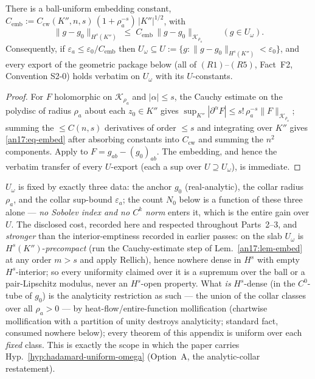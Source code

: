 \begin{lemma}
\label{an17:lem-embed}%
\label{an17:embed}%
There is a ball-uniform embedding constant, $C_{\mathrm{emb}}:=C_{\mathrm{cw}}
(K'',n,s)\,(1+\rho_a^{-s})\,|K''|^{1/2}$, with
\begin{equation}\label{an17:eq-embed}
 \|g-g_0\|_{H^s(K'')}\;\le\;C_{\mathrm{emb}}\,\|g-g_0\|_{\mathcal K_{\rho_a}}
 \qquad(g\in U_\omega).
\end{equation}
Consequently, if $\varepsilon_a\le\varepsilon_0/C_{\mathrm{emb}}$ then
$U_\omega\subseteq U:=\{g:\|g-g_0\|_{H^s(K'')}<\varepsilon_0\}$, and every export
of the geometric package below (all of $(R1)$--$(R5)$, Fact~F2, Convention
S2-0) holds verbatim on $U_\omega$ with its $U$-constants.
\end{lemma}
\begin{proof}
For $F$ holomorphic on $\mathcal K_{\rho_a}$ and $|\alpha|\le s$, the Cauchy
estimate on the polydisc of radius $\rho_a$ about each $z_0\in K''$ gives
$\sup_{K''}|\partial^\alpha F|\le s!\,\rho_a^{-s}\|F\|_{\mathcal K_{\rho_a}}$;
summing the $\le C(n,s)$ derivatives of order $\le s$ and integrating over $K''$
gives \eqref{an17:eq-embed} after absorbing constants into $C_{\mathrm{cw}}$ and
summing the $n^2$ components. Apply to $F=g_{ab}-(g_0)_{ab}$. The embedding, and
hence the verbatim transfer of every $U$-export (each a sup over $U\supseteq
U_\omega$), is immediate.
\end{proof}

\begin{remark}
\label{an17:rem-data}
$U_\omega$ is fixed by exactly three data: the anchor $g_0$ (real-analytic), the
collar radius $\rho_a$, and the collar sup-bound $\varepsilon_a$; the count $N_0$
below is a function of these three alone --- \emph{no Sobolev index and no $C^k$
norm} enters it, which is the entire gain over $U$. The disclosed cost, recorded
here and respected throughout Parts~2--3, and \emph{stronger} than the
interior-emptiness recorded in earlier passes: on the slab $U_\omega$ is
$H^s(K'')$-\emph{precompact} (run the Cauchy-estimate step of
Lem.~\ref{an17:lem-embed} at any order $m>s$ and apply Rellich), hence nowhere
dense in $H^s$ with empty $H^s$-interior; so every uniformity claimed over it is
a supremum over the ball or a pair-Lipschitz modulus, never an $H^s$-open
property. What \emph{is} $H^s$-dense (in the $C^0$-tube of $g_0$) is the
analyticity restriction as such --- the union of the collar classes over all
$\rho_a>0$ --- by heat-flow/entire-function mollification (chartwise
mollification with a partition of unity destroys analyticity; standard fact,
consumed nowhere below); every theorem of this appendix is uniform over each
\emph{fixed} class. This is exactly the
scope in which the paper carries Hyp.~\ref{hyp:hadamard-uniform-omega} (Option~A,
the analytic-collar restatement).
\end{remark}


